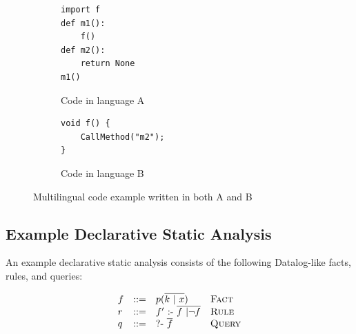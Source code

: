 \begin{figure}[t]
  \centering
  \begin{subfigure}[t]{0.3\textwidth}
    \begin{lstlisting}[style=mpython]
import f
def m1():
    f()
def m2():
    return None
m1()
    \end{lstlisting}
    \vspace*{-.5em}
    \caption{\normalsize Code in language A}
    \label{fig:exam:langA}
  \end{subfigure}
  \begin{subfigure}[t]{0.3\textwidth}
    \begin{lstlisting}[style=mcpp,firstnumber=7]
void f() {
    CallMethod("m2");
}
    \end{lstlisting}
    \vspace*{3.5em}
    \caption{\normalsize Code in language B}
    \label{fig:exam:langB}
  \end{subfigure}
  \vspace*{-.5em}
  \caption{Multilingual code example written in both A and B}
  \label{fig:exam}
\end{figure}

%

\subsection{Example Declarative Static Analysis}
An example declarative static analysis consists of the following Datalog-like facts, rules,
and queries:

\[
  \begin{array}{llll}
    f & ::= & p(\overline{k\ |\ x}) & \text{\sc Fact}\\
    r & ::= & f'\ \mbox{:-}\ \overline{f\ |\neg f} & \text{\sc Rule}\\
    q & ::= & \mbox{?-}\ \overline{f}\ &  \text{\sc Query}
\end{array}
\]


